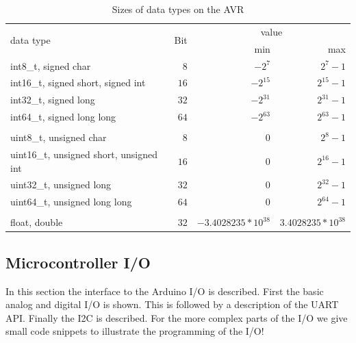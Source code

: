 \begin{table}
{\large
\begin{center}
\begin{tabular}{|l|r|r|r|}
\hline
\multirow{2}{*}{data type} & \multirow{2}{*}{Bit} & \multicolumn{2}{|c|}{value}  \\
\cline{3-4}
& & min & max \\
\hline
int8\_t, signed char				& $8$	& $-2^{7}$		& $2^{7}-1$	\\
int16\_t, signed short, signed int		& $16$	& $-2^{15}$		& $2^{15}-1$	\\
int32\_t, signed long				& $32$ 	& $-2^{31}$		& $2^{31}-1$	\\
int64\_t, signed long long			& $64$ 	& $-2^{63}$		& $2^{63}-1$	\\
& & & \\
uint8\_t, unsigned char			& $8$	& $0$			& $2^{8}-1$	\\
uint16\_t, unsigned short, unsigned int	& $16$ 	& $0$ 			& $2^{16}-1$	\\
uint32\_t, unsigned long			& $32$ 	& $0$			& $2^{32}-1$	\\
uint64\_t, unsigned long long		& $64$ 	& $0$			& $2^{64}-1$	\\
& & & \\
float, double					& $32$ 	& $-3.4028235*10^{38}$	& $3.4028235*10^{38}$	\\
\hline
\end{tabular}
\end{center}
}
\caption{Sizes of data types on the AVR}
\label{tab:datatypes}
\end{table}



\subsection{Microcontroller I/O} \label{sec:microcontrollerIO}
In this section the interface to the Arduino I/O is described.
First the basic analog and digital I/O is shown.
This is followed by a description of the UART API. 
Finally the I2C is described.
For the more complex parts of the I/O we give small code snippets to illustrate the programming of the I/O!


